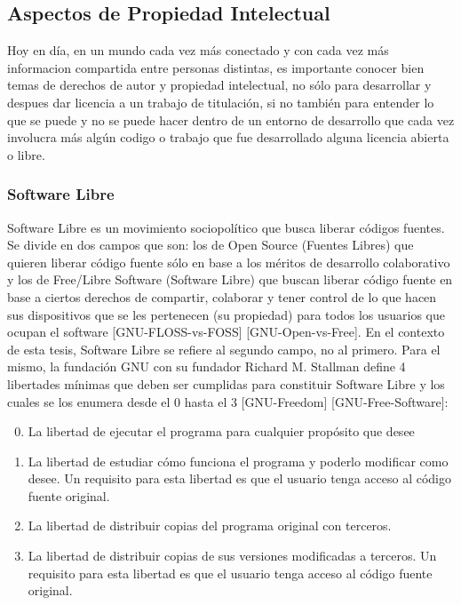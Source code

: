 \subsection{Aspectos de Propiedad Intelectual}
Hoy en día, en un mundo cada vez más conectado y con cada vez más informacion compartida entre personas distintas, es importante conocer bien temas de derechos de autor y propiedad intelectual, no sólo para desarrollar y despues dar licencia a un trabajo de titulación, si no también para entender lo que se puede y no se puede hacer dentro de un entorno de desarrollo que cada vez involucra más algún codigo o trabajo que fue desarrollado alguna licencia abierta o libre.

\subsubsection{Software Libre}
Software Libre es un movimiento sociopolítico que busca liberar códigos fuentes. Se divide en dos campos que son: los de Open Source (Fuentes Libres) que quieren liberar código fuente sólo en base a los méritos de desarrollo colaborativo y los de Free/Libre Software (Software Libre) que buscan liberar código fuente en base a ciertos derechos de compartir, colaborar y tener control de lo que hacen sus dispositivos que se les pertenecen (su propiedad) para todos los usuarios que ocupan el software [GNU-FLOSS-vs-FOSS] [GNU-Open-vs-Free]. En el contexto de esta tesis, Software Libre se refiere al segundo campo, no al primero. Para el mismo, la fundación GNU con su fundador Richard M. Stallman define 4 libertades mínimas que deben ser cumplidas para constituir Software Libre y los cuales se los enumera desde el 0 hasta el 3 [GNU-Freedom] [GNU-Free-Software]:

\begin{enumerate}
  \setcounter{enumi}{-1}
  \item La libertad de ejecutar el programa para cualquier propósito que desee
  \item La libertad de estudiar cómo funciona el programa y poderlo modificar como desee. Un requisito para esta libertad es que el usuario tenga acceso al código fuente original.
  \item La libertad de distribuir copias del programa original con terceros.
  \item La libertad de distribuir copias de sus versiones modificadas a terceros. Un requisito para esta libertad es que el usuario tenga acceso al código fuente original.
\end{enumerate}

